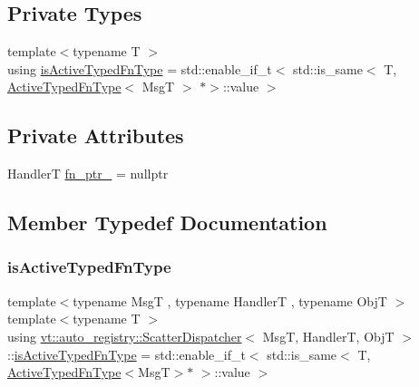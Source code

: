\subsection*{Private Types}
\begin{DoxyCompactItemize}
\item 
{\footnotesize template$<$typename T $>$ }\\using \hyperlink{structvt_1_1auto__registry_1_1_scatter_dispatcher_ab8e4df9baa8f4e9485c914dcb769e2ee}{is\+Active\+Typed\+Fn\+Type} = std\+::enable\+\_\+if\+\_\+t$<$ std\+::is\+\_\+same$<$ T, \hyperlink{namespacevt_a54eefd5373739c7365058b0d22fea6e2}{Active\+Typed\+Fn\+Type}$<$ MsgT $>$ $\ast$$>$\+::value $>$
\end{DoxyCompactItemize}
\subsection*{Private Attributes}
\begin{DoxyCompactItemize}
\item 
HandlerT \hyperlink{structvt_1_1auto__registry_1_1_scatter_dispatcher_af7ea94535c6ef560c3c0051275060d95}{fn\+\_\+ptr\+\_\+} = nullptr
\end{DoxyCompactItemize}


\subsection{Member Typedef Documentation}
\mbox{\label{structvt_1_1auto__registry_1_1_scatter_dispatcher_ab8e4df9baa8f4e9485c914dcb769e2ee}} 
\subsubsection{\texorpdfstring{is\+Active\+Typed\+Fn\+Type}{isActiveTypedFnType}}
{\footnotesize\ttfamily template$<$typename MsgT , typename HandlerT , typename ObjT $>$ \\
template$<$typename T $>$ \\
using \hyperlink{structvt_1_1auto__registry_1_1_scatter_dispatcher}{vt\+::auto\+\_\+registry\+::\+Scatter\+Dispatcher}$<$ MsgT, HandlerT, ObjT $>$\+::\hyperlink{structvt_1_1auto__registry_1_1_scatter_dispatcher_ab8e4df9baa8f4e9485c914dcb769e2ee}{is\+Active\+Typed\+Fn\+Type} =  std\+::enable\+\_\+if\+\_\+t$<$ std\+::is\+\_\+same$<$ T, \hyperlink{namespacevt_a54eefd5373739c7365058b0d22fea6e2}{Active\+Typed\+Fn\+Type}$<$MsgT$>$$\ast$ $>$\+::value $>$\hspace{0.3cm}{\ttfamily [private]}}



